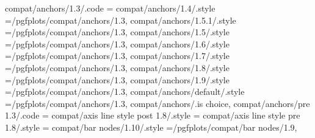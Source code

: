 compat/anchors/1.3/.code                                           ={                                                                                                                                 
compat/anchors/1.4/.style                                          ={/pgfplots/compat/anchors/1.3},                                                                                                   
compat/anchors/1.5.1/.style                                        ={/pgfplots/compat/anchors/1.3},                                                                                                   
compat/anchors/1.5/.style                                          ={/pgfplots/compat/anchors/1.3},                                                                                                   
compat/anchors/1.6/.style                                          ={/pgfplots/compat/anchors/1.3},                                                                                                   
compat/anchors/1.7/.style                                          ={/pgfplots/compat/anchors/1.3},                                                                                                   
compat/anchors/1.8/.style                                          ={/pgfplots/compat/anchors/1.3},                                                                                                   
compat/anchors/1.9/.style                                          ={/pgfplots/compat/anchors/1.3},                                                                                                   
compat/anchors/default/.style                                      ={/pgfplots/compat/anchors/1.3},                                                                                                   
compat/anchors/.is choice,
compat/anchors/pre 1.3/.code                                       ={                                                                                                                                 
compat/axis line style post 1.8/.style                             ={                                                                                                                                 
compat/axis line style pre 1.8/.style                              ={                                                                                                                                 
compat/bar nodes/1.10/.style                                       ={/pgfplots/compat/bar nodes/1.9},                                                                                                 
}}}}
